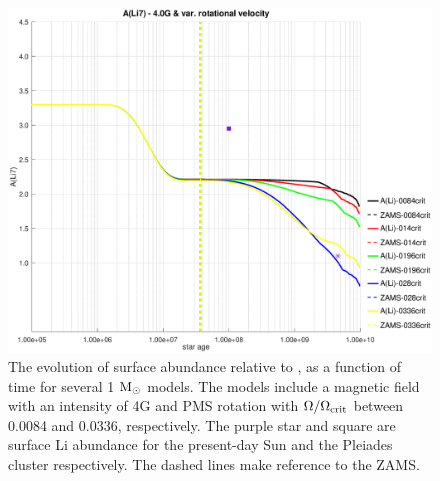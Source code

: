 \documentclass[fleqn,usenatbib]{mnras}
\begin{document}
{{\begin{figure}
	\includegraphics[trim = 35mm 15mm 20mm 15mm, clip,width=\columnwidth]{figures/li_var_vel_4_0g.eps}
    \caption{The evolution of surface  abundance relative to , as a function of time for several 1 $\mathrm{M}_\odot$ models. The models include a magnetic field with an intensity of 4G and PMS rotation with $\Omega / \Omega_{\mathrm{crit}}$ between 0.0084 and 0.0336, respectively. The purple star and square are surface Li abundance for the present-day Sun \citep{Asplund2009} and the Pleiades cluster \citep{Sestito2005} respectively. The dashed lines make reference to the ZAMS.}
    \label{fig:li_var_vel_4_0g}
\end{figure}

}}
\end{document}
